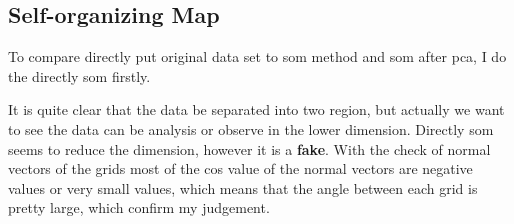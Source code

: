 \documentclass[titlepage,a4paper,12pt,thmsb]{report}
\begin{document}
\newpage

\begin{center}
\begin{figure}[h]
{\par}
\end{figure}
{}
\end{center}

\newpage


\subsection{Self-organizing Map}

To compare directly put original data set to som method and som after pca, I do the directly som firstly.

It is quite clear that the data be separated into two region, but actually we want to see the data can be analysis or observe in the lower dimension.  Directly som seems to reduce the dimension, however it is a {\bf fake}.  With the check of  normal vectors of the grids most of the cos value of the normal vectors are negative values or very small values, which means that the angle between each grid is pretty large, which confirm my judgement.


\begin{center}
\begin{figure}[h]
{\par}
\end{figure}
{}
\end{center}
\end{document}
